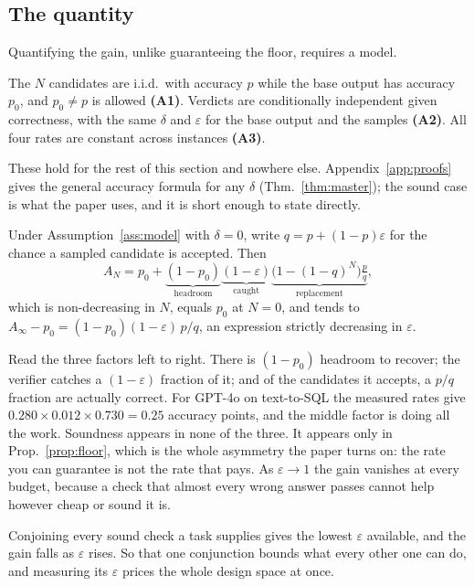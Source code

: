 \documentclass[11pt]{article}
\begin{document}
\subsection{The quantity}
Quantifying the gain, unlike guaranteeing the floor, requires a model.

\begin{assumption}\label{ass:model}
The $N$ candidates are i.i.d.\ with accuracy $p$ while the base output has
accuracy $p_0$, and $p_0\neq p$ is allowed \textbf{(A1)}. Verdicts are
conditionally independent given correctness, with the same $\delta$ and
$\varepsilon$ for the base output and the samples \textbf{(A2)}. All four rates
are constant across instances \textbf{(A3)}.
\end{assumption}

These hold for the rest of this section and nowhere else. Appendix~\ref{app:proofs} gives the general
accuracy formula for any $\delta$ (Thm.~\ref{thm:master}); the sound case is
what the paper uses, and it is short enough to state directly.

\begin{corollary}\label{cor:gain}
Under Assumption~\ref{ass:model} with $\delta=0$, write $q=p+(1-p)\varepsilon$
for the chance a sampled candidate is accepted. Then
\[
A_N=p_0+\underbrace{(1-p_0)}_{\text{headroom}}\underbrace{(1-\varepsilon)}_{\text{caught}}\underbrace{\bigl(1-(1-q)^N\bigr)\tfrac{p}{q}}_{\text{replacement}} ,
\]
which is non-decreasing in $N$, equals $p_0$ at $N=0$, and tends to
$A_\infty-p_0=(1-p_0)(1-\varepsilon)\,p/q$, an expression strictly decreasing in
$\varepsilon$.
\end{corollary}

Read the three factors left to right. There is $(1-p_0)$ headroom to recover; the
verifier catches a $(1-\varepsilon)$ fraction of it; and of the candidates it
accepts, a $p/q$ fraction are actually correct. For GPT-4o on text-to-SQL the
measured rates give $0.280\times0.012\times0.730=0.25$ accuracy points, and the
middle factor is doing all the work. Soundness appears in none of the three. It
appears only in Prop.~\ref{prop:floor}, which is the whole asymmetry the paper
turns on: the rate you can guarantee is not the rate that pays. As
$\varepsilon\to1$ the gain vanishes at every budget, because a check that almost
every wrong answer passes cannot help however cheap or sound it is.




Conjoining every sound check a task supplies gives the lowest $\varepsilon$
available, and the gain falls as $\varepsilon$ rises. So that one conjunction
bounds what every other one can do, and measuring its $\varepsilon$ prices the
whole design space at once.
\end{document}
